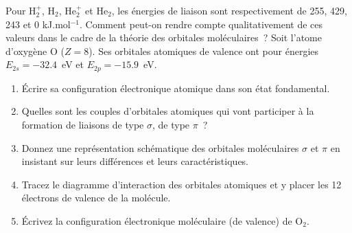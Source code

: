 %
Pour H$_2^+$, H$_2$, He$_2^+$ et He$_2$, les \'energies de liaison sont respectivement de 255, 429, 243 et 0 kJ.mol$^{-1}$. 
Comment peut-on rendre compte qualitativement de ces valeurs dans le cadre de la th\'eorie des orbitales mol\'eculaires~?
Soit l'atome d'oxyg\`ene O ($Z=8$). Ses orbitales atomiques de valence ont pour \'energies $E_{2s}=-32.4$~eV et $E_{2p}=-15.9$~eV.
\begin{enumerate}[\bf 1)]
\item \'Ecrire sa configuration \'electronique atomique dans son \'etat fondamental.
\item Quelles sont les couples d'orbitales atomiques qui vont participer \`a la formation de liaisons de type $\sigma$, de type $\pi$~?
\item Donnez une repr\'esentation sch\'ematique des orbitales mol\'eculaires $\sigma$ et $\pi$ en insistant sur leurs diff\'erences et leurs caract\'eristiques. 
\item Tracez le diagramme d'interaction des orbitales atomiques et y placer les 12 \'electrons de valence de la mol\'ecule. 
\item \'Ecrivez la configuration \'electronique mol\'eculaire (de valence) de O$_2$. 
\end{enumerate}
